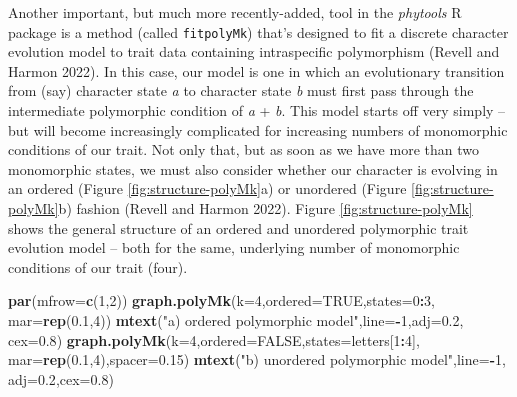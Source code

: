 \documentclass[fleqn,10pt,lineno]{wlpeerj} %
\newenvironment{Shaded}{\begin{snugshade}}{\end{snugshade}}
\newcommand{\AttributeTok}[1]{\textcolor[rgb]{0.13,0.29,0.53}{#1}}
\newcommand{\ConstantTok}[1]{\textcolor[rgb]{0.56,0.35,0.01}{#1}}
\newcommand{\DecValTok}[1]{\textcolor[rgb]{0.00,0.00,0.81}{#1}}
\newcommand{\FloatTok}[1]{\textcolor[rgb]{0.00,0.00,0.81}{#1}}
\newcommand{\FunctionTok}[1]{\textcolor[rgb]{0.13,0.29,0.53}{\textbf{#1}}}
\newcommand{\NormalTok}[1]{#1}
\newcommand{\SpecialCharTok}[1]{\textcolor[rgb]{0.81,0.36,0.00}{\textbf{#1}}}
\newcommand{\StringTok}[1]{\textcolor[rgb]{0.31,0.60,0.02}{#1}}
\begin{document}
Another important, but much more recently-added, tool in the \emph{phytools} R package is a method (called \texttt{fitpolyMk}) that's designed to fit a discrete character evolution model to trait data containing intraspecific polymorphism (Revell and Harmon 2022). In this case, our model is one in which an evolutionary transition from (say) character state \emph{a} to character state \emph{b} must first pass through the intermediate polymorphic condition of \emph{a} + \emph{b}. This model starts off very simply -- but will become increasingly complicated for increasing numbers of monomorphic conditions of our trait. Not only that, but as soon as we have more than two monomorphic states, we must also consider whether our character is evolving in an ordered (Figure \ref{fig:structure-polyMk}a) or unordered (Figure \ref{fig:structure-polyMk}b) fashion (Revell and Harmon 2022). Figure \ref{fig:structure-polyMk} shows the general structure of an ordered and unordered polymorphic trait evolution model -- both for the same, underlying number of monomorphic conditions of our trait (four).

\begin{Shaded}
\begin{Highlighting}[]
\FunctionTok{par}\NormalTok{(}\AttributeTok{mfrow=}\FunctionTok{c}\NormalTok{(}\DecValTok{1}\NormalTok{,}\DecValTok{2}\NormalTok{))}
\FunctionTok{graph.polyMk}\NormalTok{(}\AttributeTok{k=}\DecValTok{4}\NormalTok{,}\AttributeTok{ordered=}\ConstantTok{TRUE}\NormalTok{,}\AttributeTok{states=}\DecValTok{0}\SpecialCharTok{:}\DecValTok{3}\NormalTok{,}
  \AttributeTok{mar=}\FunctionTok{rep}\NormalTok{(}\FloatTok{0.1}\NormalTok{,}\DecValTok{4}\NormalTok{))}
\FunctionTok{mtext}\NormalTok{(}\StringTok{"a) ordered polymorphic model"}\NormalTok{,}\AttributeTok{line=}\SpecialCharTok{{-}}\DecValTok{1}\NormalTok{,}\AttributeTok{adj=}\FloatTok{0.2}\NormalTok{,}
  \AttributeTok{cex=}\FloatTok{0.8}\NormalTok{)}
\FunctionTok{graph.polyMk}\NormalTok{(}\AttributeTok{k=}\DecValTok{4}\NormalTok{,}\AttributeTok{ordered=}\ConstantTok{FALSE}\NormalTok{,}\AttributeTok{states=}\NormalTok{letters[}\DecValTok{1}\SpecialCharTok{:}\DecValTok{4}\NormalTok{],}
  \AttributeTok{mar=}\FunctionTok{rep}\NormalTok{(}\FloatTok{0.1}\NormalTok{,}\DecValTok{4}\NormalTok{),}\AttributeTok{spacer=}\FloatTok{0.15}\NormalTok{)}
\FunctionTok{mtext}\NormalTok{(}\StringTok{"b) unordered polymorphic model"}\NormalTok{,}\AttributeTok{line=}\SpecialCharTok{{-}}\DecValTok{1}\NormalTok{,}
  \AttributeTok{adj=}\FloatTok{0.2}\NormalTok{,}\AttributeTok{cex=}\FloatTok{0.8}\NormalTok{)}
\end{Highlighting}
\end{Shaded}
\end{document}
